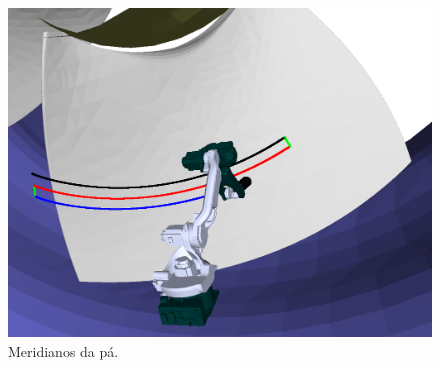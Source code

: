 \begin{figure}[!ht]
	\centering
	\includegraphics[width=\columnwidth]{figs/planejamento/meridianos.png}
	\caption{Meridianos da pá.}
	\label{fig::meridianos}
\end{figure}